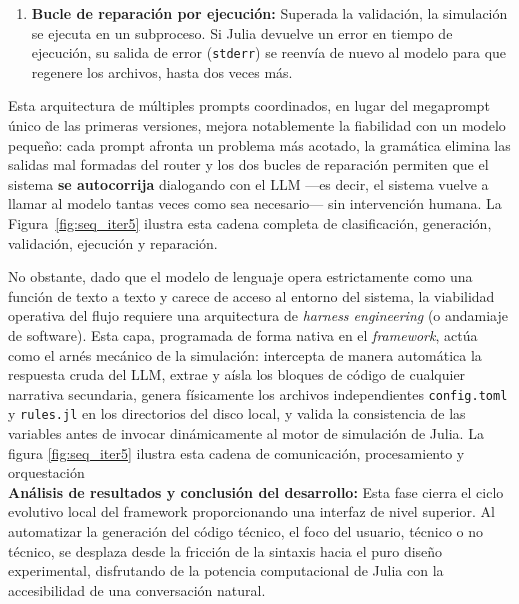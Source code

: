 \documentclass[runningheads]{llncs}
\begin{document}
\begin{enumerate}
    categoría (por ejemplo, que un campo continuo use
    \texttt{state\_type = "Float64"}, o que las densidades de población sumen la
    unidad para que la rejilla quede completamente poblada). Si la validación
    falla, el sistema reinvoca al LLM realimentándolo con el mensaje de error
    concreto para que corrija únicamente eso, repitiendo hasta tres veces.
    \item \textbf{Bucle de reparación por ejecución:} Superada la validación, la
    simulación se ejecuta en un subproceso. Si Julia devuelve un error en tiempo
    de ejecución, su salida de error (\texttt{stderr}) se reenvía de nuevo al
    modelo para que regenere los archivos, hasta dos veces más.
\end{enumerate}

Esta arquitectura de múltiples prompts coordinados, en lugar del megaprompt
único de las primeras versiones, mejora notablemente la fiabilidad con un modelo
pequeño: cada prompt afronta un problema más acotado, la gramática elimina las
salidas mal formadas del router y los dos bucles de reparación permiten que el
sistema \textbf{se autocorrija} dialogando con el LLM —es decir, el sistema
vuelve a llamar al modelo tantas veces como sea necesario— sin intervención
humana. La Figura~\ref{fig:seq_iter5} ilustra esta cadena completa de
clasificación, generación, validación, ejecución y reparación.

No obstante, dado que el modelo de lenguaje opera estrictamente como una función de texto a texto y carece de acceso al entorno del sistema, la viabilidad operativa del flujo requiere una arquitectura de \textit{harness engineering} (o andamiaje de software). Esta capa, programada de forma nativa en el \textit{framework}, actúa como el arnés mecánico de la simulación: intercepta de manera automática la respuesta cruda del LLM, extrae y aísla los bloques de código de cualquier narrativa secundaria, genera físicamente los archivos independientes \texttt{config.toml} y \texttt{rules.jl} en los directorios del disco local, y valida la consistencia de las variables antes de invocar dinámicamente al motor de simulación de Julia. La figura \ref{fig:seq_iter5} ilustra esta cadena de comunicación, procesamiento y orquestación\\

\textbf{Análisis de resultados y conclusión del desarrollo:} Esta fase cierra el ciclo evolutivo local del framework proporcionando una interfaz de nivel superior. Al automatizar la generación del código técnico, el foco del usuario, técnico o no técnico, se desplaza desde la fricción de la sintaxis hacia el puro diseño experimental, disfrutando de la potencia computacional de Julia con la accesibilidad de una conversación natural. 
\end{document}
